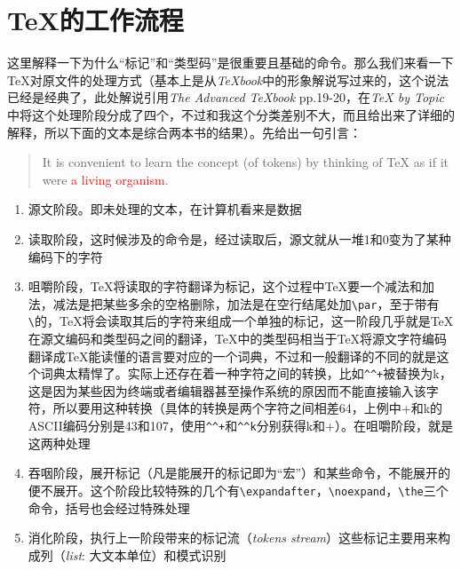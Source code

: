 \documentclass{article}
\newcommand{\Rtxt}[1]{\textcolor{red}{#1}}
\newcommand{\TeXbook}{\textit{\TeX book}}
\begin{document}
\section{\TeX 的工作流程}
这里解释一下为什么“标记”和“类型码”是很重要且基础的命令。那么我们来看一下\TeX 对原文件的处理方式（基本上是从\textit{\TeXbook}中的形象解说写过来的，这个说法已经是经典了，此处解说引用\textit{The Advanced \TeXbook} pp.19-20，在\textit{\TeX{} by Topic}中将这个处理阶段分成了四个，不过和我这个分类差别不大，而且给出来了详细的解释，所以下面的文本是综合两本书的结果）。先给出一句引言：
\begin{quotation}
It is convenient to learn the concept (of tokens) by thinking of \TeX{} as if it were \Rtxt{a living organism}.
\end{quotation}
\begin{enumerate}
\item 源文阶段。即未处理的文本，在计算机看来是数据
\item 读取阶段，这时候涉及的命令是\verb!!，经过读取后，源文就从一堆1和0变为了某种编码下的字符
\item 咀嚼阶段，\TeX 将读取的字符翻译为标记，这个过程中\TeX 要一个减法和加法，减法是把某些多余的空格删除，加法是在空行结尾处加\verb!\par!，至于带有\verb!\!的，\TeX 将会读取其后的字符来组成一个单独的标记，这一阶段几乎就是\TeX 在源文编码和类型码之间的翻译，\TeX 中的类型码相当于\TeX 将源文字符编码翻译成\TeX 能读懂的语言要对应的一个词典，不过和一般翻译的不同的就是这个词典太精悍了。实际上还存在着一种字符之间的转换，比如\verb!^^+!被替换为^^+，这是因为某些因为终端或者编辑器甚至操作系统的原因而不能直接输入该字符，所以要用这种转换（具体的转换是两个字符之间相差64，上例中+和k的ASCII编码分别是43和107，使用\verb!^^+!和\verb!^^k!分别获得^^+和^^k）。在咀嚼阶段，就是这两种处理
\item 吞咽阶段，展开标记（凡是能展开的标记即为“宏”）和某些命令，不能展开的便不展开。这个阶段比较特殊的几个有\verb!\expandafter!，\verb!\noexpand!，\verb!\the!三个命令，括号也会经过特殊处理
\item 消化阶段，执行上一阶段带来的标记流（\textit{tokens stream}）这些标记主要用来构成列（\textit{list}: 大文本单位）和模式识别
\end{enumerate}
\end{document}
